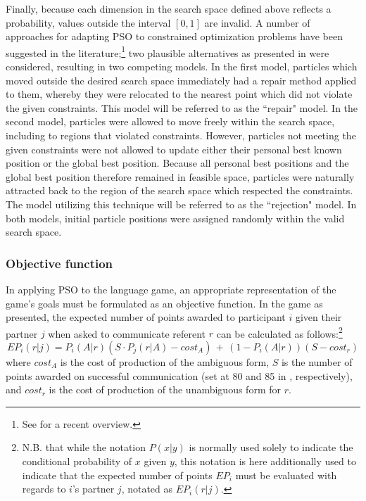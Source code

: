 \documentclass[12pt,a4paper]{article}
\begin{document}
Finally, because each dimension in the search space defined above reflects a probability, values outside the interval $[0, 1]$ are invalid. A number of approaches for adapting PSO to constrained optimization problems have been suggested in the literature;\footnote{See \cite{helwig2010} for a recent overview.} two plausible alternatives as presented in \cite{engelbrecht2005} were considered, resulting in two competing models. 
In the first model, particles which moved outside the desired search space immediately had a repair method applied to them, whereby they were relocated to the nearest point which did not violate the given constraints. This model will be referred to as the ``repair" model. In the second model, particles were allowed to move freely within the search space, including to regions that violated constraints. However, particles not meeting the given constraints were not allowed to update either their personal best known position or the global best position. Because all personal best positions and the global best position therefore remained in feasible space, particles were naturally attracted back to the region of the search space which respected the constraints. The model utilizing this technique will be referred to as the ``rejection" model. In both models, initial particle positions were assigned randomly within the valid search space.


 
\subsubsection{Objective function}
\label{sec:objective_func}
In applying PSO to the \citeauthor{rohde2012} language game, an appropriate representation of the game's goals must be formulated as an objective function. In the game as presented, the expected number of points awarded to participant $i$ given their partner $j$ when asked to communicate referent $r$ can be calculated as follows:\footnote{N.B. that while the notation $P(x|y)$ is normally used solely to indicate the conditional probability of $x$ given $y$, this notation is here additionally used to indicate that the expected number of points $EP_i$ must be evaluated with regards to $i$'s partner $j$, notated as $EP_{i}(r|j)$.}
\begin{equation}
EP_{i}(r|j) = P_i(A|r)(S \cdot P_j(r|A) - cost_A) \,+\, (1 - P_i(A|r))(S - cost_r) 
\end{equation}
where $cost_A$ is the cost of production of the ambiguous form, $S$ is the number of points awarded on successful communication (set at 80 and 85 in \citeauthor{rohde2012}, respectively), and $cost_r$ is the cost of production of the unambiguous form for $r$.
\end{document}
